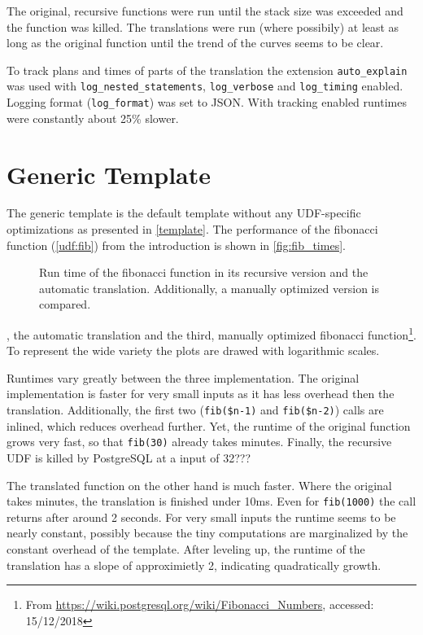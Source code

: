The original, recursive functions were run until the stack size was exceeded and the function was killed. The translations were run (where possibily) at least as long as the original function until the trend of the curves seems to be clear.

To track plans and times of parts of the translation the extension \texttt{auto\_explain} was used with \texttt{log\_nested\_statements}, \texttt{log\_verbose} and \texttt{log\_timing} enabled. Logging format (\texttt{log\_format}) was set to JSON. With tracking enabled runtimes were constantly about 25\% slower.

\section{Generic Template}

The generic template is the default template without any UDF-specific optimizations as presented in \autoref{template}. The performance of the fibonacci function (\autoref{udf:fib}) from the introduction is shown in \autoref{fig:fib_times}.

\begin{figure}[h!]
    \centering
    
    \caption{Run time of the fibonacci function in its recursive version and the automatic translation. Additionally, a manually optimized version is compared.}
    \label{fig:fib_times}
\end{figure}

, the automatic translation and the third, manually optimized fibonacci function\footnote{From \url{https://wiki.postgresql.org/wiki/Fibonacci_Numbers}, accessed: 15/12/2018}. To represent the wide variety the plots are drawed with logarithmic scales.

Runtimes vary greatly between the three implementation. The original implementation is faster for very small inputs as it has less overhead then the translation. Additionally, the first two (\texttt{fib(\$n-1)} and \texttt{fib(\$n-2)}) calls are inlined, which reduces overhead further. Yet, the runtime of the original function grows very fast, so that \texttt{fib(30)} already takes minutes. Finally, the recursive UDF is killed by PostgreSQL at a input of 32???

The translated function on the other hand is much faster. Where the original takes minutes, the translation is finished under 10ms. Even for \texttt{fib(1000)} the call returns after around 2 seconds. For very small inputs the runtime seems to be nearly constant, possibly because the tiny computations are marginalized by the constant overhead of the template. After leveling up, the runtime of the translation has a slope of approximietly 2, indicating quadratically growth.

